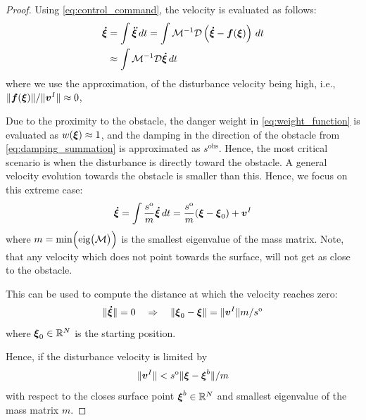 \begin{proof}
Using \eqref{eq:control_command}, the velocity is evaluated as follows:
\begin{equation}
\begin{split}
    \boldsymbol{\dot \xi} & = \int \boldsymbol{\ddot \xi} \, dt 
    = \int \mathcal{M}^{-1} \mathcal{D}  \left( \boldsymbol{\dot \xi} - \boldsymbol{f}(\boldsymbol{\xi}) \right) \, dt \\
    & \approx \int \mathcal{M}^{-1} \mathcal{D} \boldsymbol{\dot \xi} \, dt
\end{split}
\end{equation}
where we use the approximation, of the disturbance velocity being high, i.e., $\| \boldsymbol{f}(\boldsymbol{\xi}) \| / \|\boldsymbol{v}^I \| \approx 0 $, 

Due to the proximity to the obstacle, the danger weight in \eqref{eq:weight_function} is evaluated as $w(\boldsymbol{\xi}) \approx 1$, and the damping in the direction of the obstacle from \eqref{eq:damping_summation} is approximated as $s^{\mathrm{obs}}$. 
Hence, the most critical scenario is when the disturbance is directly toward the obstacle. A general velocity evolution towards the obstacle is smaller than this.
Hence, we focus on this extreme case:
\begin{equation}
    \vecs{\dot \xi} = \int \frac{s^{\mathrm{o}}}{m} \vecs{ \dot \xi} \, dt = \frac{s^{\mathrm{o}}}{m} (\vecs{\xi} - \vecs \xi_0)  + \vecs v^I \label{eq:velocity_with_control}
\end{equation}
where $m = \min \Bigl(\text{eig} \bigl(\mathcal{M} \bigr) \Bigr)$ is the smallest eigenvalue of the mass matrix. Note, that any velocity which does not point towards the surface, will not get as close to the obstacle.

This can be used to compute the distance at which the velocity reaches zero:
\begin{equation}
    \| \boldsymbol{\dot \xi} \| = 0
    \quad \Rightarrow \quad
    \|\boldsymbol{\xi}_0 - \boldsymbol{\xi} \| = \| \boldsymbol{v}^I \| {m} / {s^{\mathrm{o}}} 
\end{equation}
where $\boldsymbol{\xi}_0 \in \mathbb{R}^N $ is the starting position. 

Hence, if the disturbance velocity is limited by 
\begin{equation}
    \| \boldsymbol{v}^I \| < s^{\mathrm{o}} \| \boldsymbol{\xi} - \boldsymbol{\xi}^b \| / m
\end{equation}
with respect to the closes surface point $\boldsymbol{\xi}^b \in \mathbb{R}^N$ and smallest eigenvalue of the mass matrix $m$.
\end{proof}

